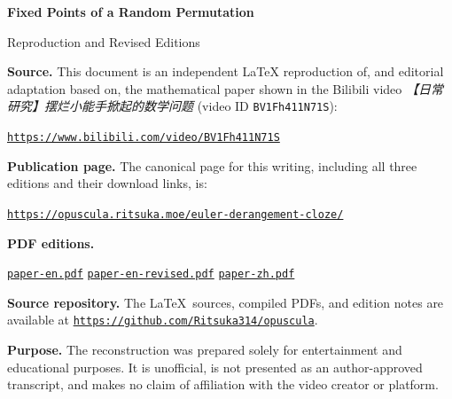 \hypersetup{pageanchor=false}
\begin{titlepage}
\thispagestyle{empty}
\centering

\vspace*{1.2cm}

{\Huge\bfseries Fixed Points of a Random Permutation\par}
\vspace{0.45cm}
{\Large Reproduction and Revised Editions\par}

\vspace{1.1cm}

\begin{minipage}{0.86\textwidth}
\raggedright

\textbf{Source.}
This document is an independent LaTeX reproduction of, and editorial
adaptation based on, the mathematical paper shown in the Bilibili video
\emph{【日常研究】摆烂小能手掀起的数学问题} (video ID
\texttt{BV1Fh411N71S}):
\begin{center}
  \href{https://www.bilibili.com/video/BV1Fh411N71S}
       {\nolinkurl{https://www.bilibili.com/video/BV1Fh411N71S}}
\end{center}

\textbf{Publication page.}
The canonical page for this writing, including all three editions and their
download links, is:
\begin{center}
  \href{https://opuscula.ritsuka.moe/euler-derangement-cloze/}
       {\nolinkurl{https://opuscula.ritsuka.moe/euler-derangement-cloze/}}
\end{center}

\textbf{PDF editions.}
\begin{center}
  \small
  \href{https://opuscula.ritsuka.moe/euler-derangement-cloze/paper-en.pdf}
       {\texttt{paper-en.pdf}}
  \quad
  \href{https://opuscula.ritsuka.moe/euler-derangement-cloze/paper-en-revised.pdf}
       {\texttt{paper-en-revised.pdf}}
  \quad
  \href{https://opuscula.ritsuka.moe/euler-derangement-cloze/paper-zh.pdf}
       {\texttt{paper-zh.pdf}}
\end{center}

\smallskip
{\small
\textbf{Source repository.}
The \LaTeX\ sources, compiled PDFs, and edition notes are available at
\href{https://github.com/Ritsuka314/opuscula}
     {\nolinkurl{https://github.com/Ritsuka314/opuscula}}.\par
}

\textbf{Purpose.}
The reconstruction was prepared solely for entertainment and educational
purposes. It is unofficial, is not presented as an author-approved
transcript, and makes no claim of affiliation with the video creator or
platform.


\end{minipage}
\end{titlepage}
